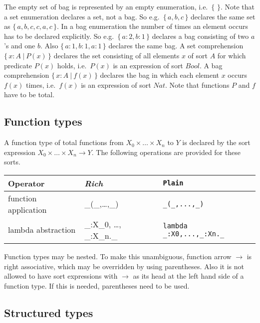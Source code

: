\documentclass[a4paper,fleqn]{article}
\newcommand{\frm}[1]{\mbox{\ensuremath{#1}}}
\newcommand{\f}[1]{\ensuremath{\mathit{#1}}}
\newcommand{\fa}[2]{\ensuremath{\f{#1}(#2)}}
\newcommand{\To}{\ensuremath{\rightarrow}}
\newcommand{\set}[1]{\ensuremath{\{\,#1\,\}}}
\newcommand{\bag}[1]{\ensuremath{\set{#1}}}
\newcommand{\scompr}[2]{\ensuremath{\set{#1\ |\ #2}}}
\newcommand{\srtbool}{\f{Bool}}
\newcommand{\srtnat}{\f{Nat}}
\begin{document}
\noindent
The empty set of bag is represented by an empty enumeration, i.e.\
\frm{\set{}}. Note that a set enumeration declares a set, not a bag. So e.g.\
\frm{\set{a,b,c}} declares the same set as \frm{\set{a,b,c,c,a,c}}. In a bag
enumeration the number of times an element occurs has to be declared explicitly.
So e.g.\ \frm{\bag{a:2,b:1}} declares a bag consisting of two \frm{a}'s and one
\frm{b}. Also \frm{\bag{a:1,b:1,a:1}} declares the same bag. A set
comprehension \frm{\scompr{x:A}{\fa{P}{x}}} declares the set consisting of all
elements \frm{x} of sort \frm{A} for which predicate \frm{\fa{P}{x}} holds,
i.e.\ \frm{\fa{P}{x}} is an expression of sort \frm{\srtbool}. A bag
comprehension \frm{\scompr{x:A}{\fa{f}{x}}} declares the bag in which each
element \frm{x} occurs \frm{\fa{f}{x}} times, i.e.\ \frm{\fa{f}{x}} is an
expression of sort \frm{\srtnat}. Note that functions \frm{P} and \frm{f} have
to be total.

\subsection{Function types}

A function type of total functions from \frm{X_{0} \times \ldots \times X_{n}}
to \frm{Y} is declared by the sort expression \frm{X_{0} \times \ldots \times
X_{n} \To Y}. The following operations are provided for these sorts.

\bigskip
\begin{tabular}{|l@{\qquad}L@{\qquad}l|}
\hline
Operator                   & \textit{Rich}          & \verb+Plain+\\\hline
function application       & \_(\_,\ldots,\_)       & \verb+_(_,...,_)+\\
lambda abstraction         & \lambda \_{:}X_{0}, \ldots, \_{:}X_{n}.\_
                                          & \verb+lambda _:X0,...,_:Xn._+\\
\hline
\end{tabular}\bigskip

\noindent
Function types may be nested. To make this unambiguous, function arrow
\frm{\To} is right associative, which may be overridden by using parentheses.
Also it is not allowed to have sort expressions with \frm{\To} as its head at
the left hand side of a function type. If this is needed, parentheses need to
be used.


\subsection{Structured types}
\end{document}

